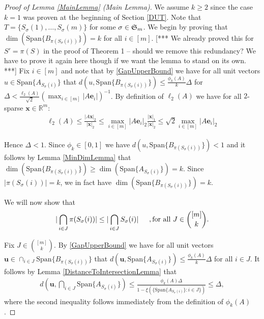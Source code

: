 \documentclass[journal, onecolumn]{IEEEtran}
\begin{document}
\begin{proof}[Proof of Lemma \ref{MainLemma} (Main Lemma)]
We assume $k \geq 2$ since the case $k = 1$ was proven at the beginning of Section \ref{DUT}. Note that $T = \{S_\sigma(1), \ldots, S_\sigma(m)\}$ for some $\sigma \in \frak{S}_m$. We begin by proving that $\dim(\text{Span}\{B_{\pi(S_\sigma(i))}\}) = k$ for all $i \in [m]$. [*** We already proved this for $S' = \pi(S)$ in the proof of Theorem 1 -- should we remove this redundancy? We have to prove it again here though if we want the lemma to stand on its own. ***] Fix $i \in [m]$ and note that by \eqref{GapUpperBound} we have for all unit vectors $u \in \text{Span}\{A_{S_\sigma(i)}\}$ that $d(u, \text{Span}\{B_{\pi(S_\sigma(i))}\}) \leq \frac{\phi_k(A)}{k} \Delta$ for $\Delta < \frac{\ell_2(A)}{\sqrt{2}} \left( \max_{i \in [m]} |A\mathbf{e}_i| \right)^{-1}$. By definition of $\ell_2(A)$ we have for all $2$-sparse $\mathbf{x} \in \mathbb{R}^m$:
\begin{align}
\ell_2(A) \leq \frac{|A\mathbf{x}|_2}{|\mathbf{x}|_2} \leq \max_{i \in [m]} |A\mathbf{e}_i|_2 \frac{|\mathbf{x}|_1}{|\mathbf{x}|_2} \leq \sqrt{2} \max_{i \in [m]}|A\mathbf{e}_i|_2
\end{align}

Hence $\Delta < 1$. Since $\phi_k \in [0,1]$ we have $d(u, \text{Span}\{B_{\pi(S_\sigma(i))}\}) < 1$ and it follows by Lemma \ref{MinDimLemma} that $\dim(\text{Span}\{B_{\pi(S_\sigma(i))}\}) \geq \dim(\text{Span}\{A_{S_\sigma(i)}\}) = k$. Since $|\pi(S_\sigma(i))| = k$, we in fact have $\dim(\text{Span}\{B_{\pi(S_\sigma(i))}\}) = k$. %

We will now show that
\begin{align}\label{fact2}
|\bigcap_{i \in J} \pi(S_\sigma(i))| \leq |\bigcap_{i \in J} S_\sigma(i) | \indent, \text{for all} \ J \in {[m] \choose k}.
\end{align}

Fix $J \in {[m] \choose k}$. By \eqref{GapUpperBound} we have for all unit vectors $\mathbf{u} \in \cap_{i \in J} \text{Span}\{B_{\pi(S_\sigma(i))}\}$ that $d(\mathbf{u}, \text{Span}\{A_{S_\sigma(i)}\}) \leq \frac{\phi_k(A)}{k} \Delta$ for all $i \in J$. It follows by Lemma \ref{DistanceToIntersectionLemma} that
\begin{align*}
d\left( \mathbf{u}, \bigcap_{i \in J} \text{Span}\{A_{S_{\sigma}(i)}\} \right) 
\leq \frac{ \phi_k(A) \Delta  }{1 - \xi( \{ \text{Span}\{A_{S_{\sigma}(i)}\}: i \in J\} ) } \leq \Delta,
\end{align*}
%
where the second inequality follows immediately from the definition of $\phi_k(A)$. 


\end{proof}
\end{document}

